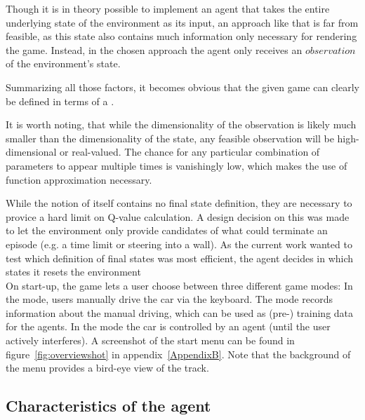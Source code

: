 Though it is in theory possible to implement an agent that takes the entire underlying state of the environment as its input, an approach like that is far from feasible, as this state also contains much information only necessary for rendering the game. Instead, in the chosen approach the agent only receives an $observation$ of the environment's state. 

Summarizing all those factors, it becomes obvious that the given game can clearly be defined in terms of a .

It is worth noting, that while the dimensionality of the observation is likely much smaller than the dimensionality of the state, any feasible observation will be high-dimensional or real-valued. The chance for any particular combination of parameters to appear multiple times is vanishingly low, which makes the use of function approximation necessary.

While the notion of  itself contains no final state definition, they are necessary to provice a hard limit on Q-value calculation. A design decision on this was made to let the environment only provide candidates of what could terminate an episode (e.g. a time limit or steering into a wall). As the current work wanted to test which definition of final states was most efficient, the agent decides in which states it resets the environment \\

On start-up, the game lets a user choose between three different game modes: In the  mode, users manually drive the car via the keyboard. The  mode records information about the manual driving, which can be used as (pre-) training data for the agents. In the  mode the car is controlled by an agent (until the user actively interferes). A screenshot of the start menu can be found in figure~\ref{fig:overviewshot} in appendix~\ref{AppendixB}. Note that the background of the menu provides a bird-eye view of the track.

\subsection{Characteristics of the agent}
\label{ch:agentchars}

